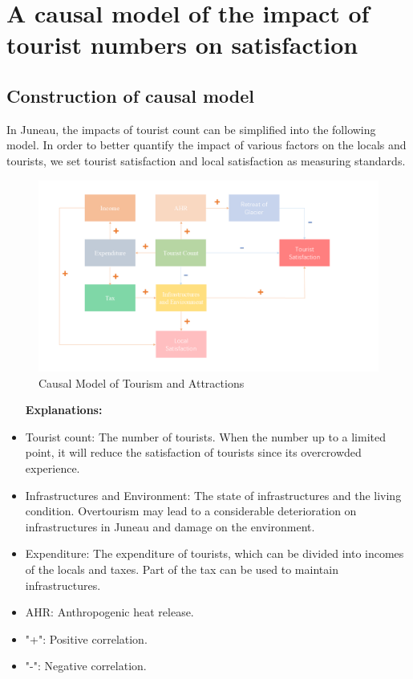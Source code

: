 \documentclass[12pt]{article}  %
\begin{document}
 
 
 \section{A causal model of the impact of tourist numbers on satisfaction}
 \subsection{Construction of causal model}
 In Juneau, the impacts of tourist count can be simplified into the following model. In order to better quantify the impact of various factors on the locals and tourists, we set tourist satisfaction and local satisfaction as measuring standards.
 
 \begin{figure}[htbp]  %
 
    \centering  %
    \includegraphics[width=1.2\textwidth]{chart1.png} %
    \caption{Causal Model of Tourism and Attractions} %
    \label{fig1}%
    \end{figure}
 

 \begin{itemize}
     \setlength{\parsep}{0ex} %
     \setlength{\topsep}{2ex} %
     \setlength{\itemsep}{1ex} %
 \item [\textbf{Explanations:}] 
        \item Tourist count: The number of tourists. When the number up to a limited point, it will reduce the satisfaction of tourists since its overcrowded experience.
        \item Infrastructures and Environment: The state of infrastructures and the living condition. Overtourism may lead to a considerable deterioration on infrastructures in Juneau and damage on the environment.
        \item Expenditure: The expenditure of tourists, which can be divided into incomes of the locals and taxes. Part of the tax can be used to maintain infrastructures.
        \item AHR: Anthropogenic heat release.
        \item "+": Positive correlation.
        \item "-": Negative correlation.\\
 \end{itemize}
\end{document}
